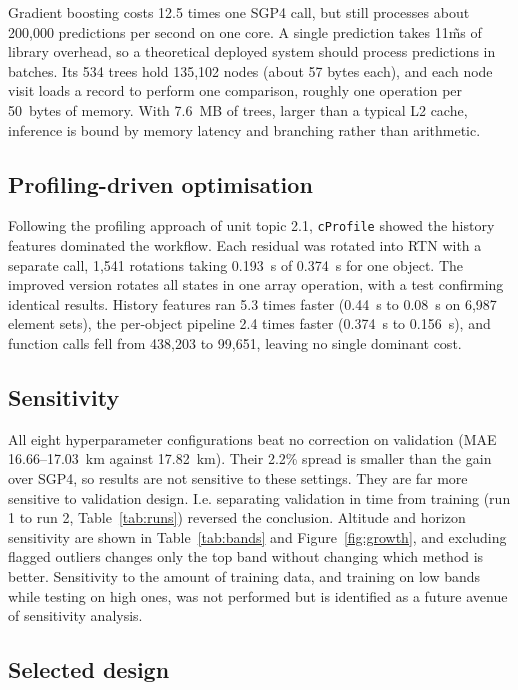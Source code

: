 \documentclass[11pt, a4paper]{article}
\begin{document}
Gradient boosting costs 12.5 times one SGP4 call, but still processes about 200,000 predictions per second on one core. A single prediction takes 11\~ms of library overhead, so a theoretical deployed system should process predictions in batches. Its 534 trees hold 135,102 nodes (about 57 bytes each), and each node visit loads a record to perform one comparison, roughly one operation per 50~bytes of memory. With 7.6~MB of trees, larger than a typical L2 cache, inference is bound by memory latency and branching rather than arithmetic.

\subsection{Profiling-driven optimisation}

Following the profiling approach of unit topic 2.1, \texttt{cProfile} showed the history features dominated the workflow. Each residual was rotated into RTN with a separate call, 1,541 rotations taking 0.193~s of 0.374~s for one object. The improved version rotates all states in one array operation, with a test confirming identical results. History features ran 5.3 times faster (0.44~s to 0.08~s on 6,987 element sets), the per-object pipeline 2.4 times faster (0.374~s to 0.156~s), and function calls fell from 438,203 to 99,651, leaving no single dominant cost.

\subsection{Sensitivity}

All eight hyperparameter configurations beat no correction on validation (MAE 16.66--17.03~km against 17.82~km). Their 2.2\% spread is smaller than the gain over SGP4, so results are not sensitive to these settings. They are far more sensitive to validation design. I.e. separating validation in time from training (run 1 to run 2, Table~\ref{tab:runs}) reversed the conclusion. Altitude and horizon sensitivity are shown in Table~\ref{tab:bands} and Figure~\ref{fig:growth}, and excluding flagged outliers changes only the top band without changing which method is better. Sensitivity to the amount of training data, and training on low bands while testing on high ones, was not performed but is identified as a future avenue of sensitivity analysis.

\subsection{Selected design}
\end{document}
